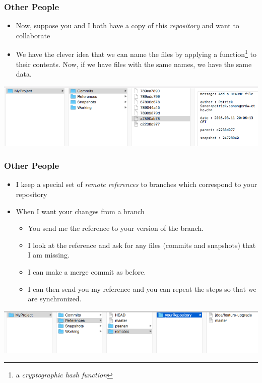 \documentclass{beamer}
\begin{document}
\begin{frame}[fragile]
\frametitle{Other People}
\begin{itemize}
\item Now, suppose you and I both have a copy of this \emph{repository} and want to collaborate
\item We have the clever idea that we can name the files by applying a function\footnote{a \emph{cryptographic hash function}} to their contents. Now, if we have files with the same names, we have the same data.
\end{itemize}
\includegraphics[scale=0.4]{remote1.png}\\
\vspace{10px}
\end{frame}

\begin{frame}[fragile]
\frametitle{Other People}
\begin{itemize}
\item I keep a special set of \emph{remote references} to branches which correspond to your repository
\item When I want your changes from a branch
\begin{itemize}
\item You send me the reference to your version of the branch.
\item I look at the reference and ask for any files (commits and snapshots) that I am missing.
\item I can make a merge commit as before. 
\item I can then send you my reference and you can repeat the steps so that we are synchronized.
\end{itemize}
\end{itemize}
\includegraphics[scale=0.4]{remote2.png}
\vspace{10px}
\end{frame}
\end{document}
